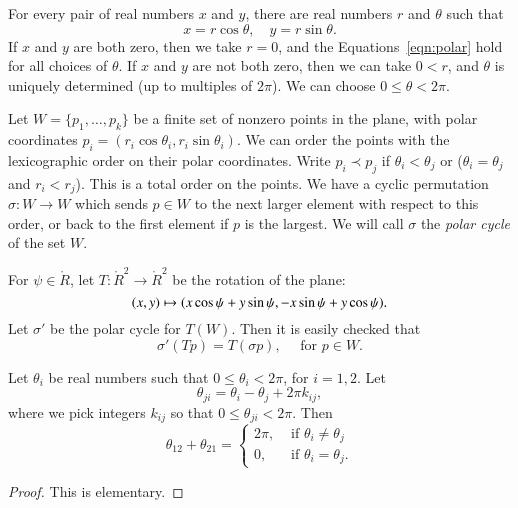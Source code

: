 For every pair of real numbers $x$ and $y$,  there are real numbers
$r$ and $\theta$ such that
    \begin{equation}\label{eqn:polar}
    x = r\cos\theta,\quad y = r\sin\theta.
    \end{equation}
If $x$ and $y$ are both zero, then we take $r=0$, and the
Equations~\ref{eqn:polar} hold for all choices of $\theta$. If $x$
and $y$ are not both zero, then we can take $0<r$, and $\theta$ is
uniquely determined (up to multiples of $2\pi$).  We can choose
$0\le\theta < 2\pi$.

Let $W=\{p_1,\ldots,p_k\}$ be a finite set of
nonzero points in the plane, with
polar coordinates $p_i = (r_i\cos\theta_i,r_i\sin\theta_i)$.
We can order the points with the lexicographic order on their
polar coordinates.  Write $p_i \prec p_j$ if
$\theta_i < \theta_j$ or ($\theta_i=\theta_j$ and $r_i<r_j$).
This is a total order on the points.
We have a cyclic permutation $\sigma:W\to W$ which sends
$p\in W$ to the next larger element with respect to this order,
or back to the first element if $p$ is the largest.
We will call $\sigma$ the {\it polar cycle}
of the set $W$.




For $\psi\in\ring{R}$, let $T:\ring{R}^2\to\ring{R}^2$ be the
rotation of the plane:
   \begin{equation}
   \label{eqn:rotate}
   (x,y) \mapsto  (x\cos\psi + y\sin\psi,-x\sin\psi+y\cos\psi).
   \index{rotation}
   \end{equation}
Let $\sigma'$ be the polar cycle for $T(W)$.  Then it is easily
checked that
$$
   \sigma'(T p) = T (\sigma p),\quad \text{ for } p\in W. 
$$

\begin{lemma}\label{lemma:polar2}
Let $\theta_i$ be real numbers such that $0\le \theta_i < 2\pi$, for $i=1,2$.
Let $$\theta_{ji} = \theta_i - \theta_j + 2\pi k_{ij},$$
where we pick integers $k_{ij}$ so that $0\le \theta_{ji}< 2\pi$.
Then 
$$
  \theta_{12} + \theta_{21} = \begin{cases}
    2\pi, & \text{ if }\theta_i\ne\theta_j\\
    0,    & \text{ if }\theta_i=\theta_j.
    \end{cases}
$$
\end{lemma}

\begin{proof} This is elementary.
\end{proof}


